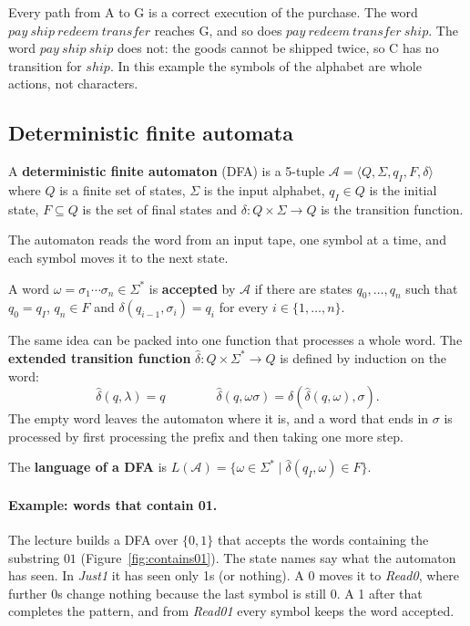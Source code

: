 Every path from A to G is a correct execution of the purchase. The word
$\mathit{pay}\ \mathit{ship}\ \mathit{redeem}\ \mathit{transfer}$ reaches G, and so
does $\mathit{pay}\ \mathit{redeem}\ \mathit{transfer}\ \mathit{ship}$. The word
$\mathit{pay}\ \mathit{ship}\ \mathit{ship}$ does not: the goods cannot be
shipped twice, so C has no transition for $\mathit{ship}$. In this example the
symbols of the alphabet are whole actions, not characters.

\subsection{Deterministic finite automata}

\begin{definition}
A \textbf{deterministic finite automaton} (DFA) is a 5-tuple $\mathcal{A} =
\langle Q, \Sigma, q_I, F, \delta \rangle$ where $Q$ is a finite set of states,
$\Sigma$ is the input alphabet, $q_I \in Q$ is the initial state, $F \subseteq Q$
is the set of final states and $\delta : Q \times \Sigma \to Q$ is the transition
function.
\end{definition}

The automaton reads the word from an input tape, one symbol at a time, and
each symbol moves it to the next state.

\begin{definition}
A word $\omega = \sigma_1 \cdots \sigma_n \in \Sigma^*$ is \textbf{accepted} by
$\mathcal{A}$ if there are states $q_0, \dots, q_n$ such that $q_0 = q_I$,
$q_n \in F$ and $\delta(q_{i-1}, \sigma_i) = q_i$ for every $i \in \{1, \dots, n\}$.
\end{definition}

The same idea can be packed into one function that processes a whole word.
The \textbf{extended transition function} $\hat\delta : Q \times \Sigma^* \to Q$
is defined by induction on the word:
\[
  \hat\delta(q, \lambda) = q
  \qquad\qquad
  \hat\delta(q, \omega\sigma) = \delta(\hat\delta(q, \omega), \sigma).
\]
The empty word leaves the automaton where it is, and a word that ends in
$\sigma$ is processed by first processing the prefix and then taking one more
step.

\begin{definition}
The \textbf{language of a DFA} is $L(\mathcal{A}) = \{ \omega \in \Sigma^* \mid
\hat\delta(q_I, \omega) \in F \}$.
\end{definition}

\paragraph{Example: words that contain 01.} The lecture builds a DFA over
$\{0, 1\}$ that accepts the words containing the substring $01$
(Figure~\ref{fig:contains01}). The state names say what the automaton has
seen. In \textit{Just1} it has seen only 1s (or nothing). A 0 moves it to
\textit{Read0}, where further 0s change nothing because the last symbol is
still 0. A 1 after that completes the pattern, and from \textit{Read01} every
symbol keeps the word accepted.

